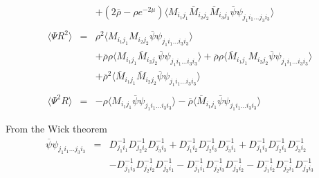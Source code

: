 \documentclass[a4paper,10pt]{report}
\newcommand{\ol}[1]{\overline{#1}}
\newcommand{\rrb}{\overline{\rho}}
\newcommand{\rr}{\rho}
\newcommand{\Mb}{\ol{M}}
\newcommand{\mv}[1]{\langle #1 \rangle}
\newcommand{\ppb}{\ol{\psi}\psi}
\newcommand{\D}{D^{-1}}
\begin{document}
\begin{eqnarray}
          && + (2\rrb-\rr e^{-2\mu}) \mv{M_{i_1j_1}\Mb_{i_2j_2}\Mb_{i_3j_3} \ppb_{j_1i_1...j_3i_3}}    \\
\nonumber\\
\mv{\Psi R^2} &=& \rr^2 \mv{M_{i_1j_1}M_{i_2j_2} \ppb_{j_1i_1...i_3i_3}} \nonumber\\
          && +  \rrb \rr \mv{M_{i_1j_1}\Mb_{i_2j_2} \ppb_{j_1i_1...i_3i_3}} 
          + \rrb \rr \mv{\Mb_{i_1j_1}M_{i_2j_2} \ppb_{j_1i_1...i_3i_3}} \nonumber\\
          && + \rrb^2 \mv{\Mb_{i_1j_1}\Mb_{i_2j_2}\ppb_{j_1i_1...i_3i_3}}    \\
\nonumber\\
\mv{\Psi^2 R} &=&  - \rr \mv{M_{i_1j_1}\ppb_{j_1i_1...i_3i_3}} - \rrb \mv{\Mb_{i_1j_1} \ppb_{j_1i_1...i_3i_3}}
\end{eqnarray}

\vspace*{3mm}
\noindent From the Wick theorem
\begin{eqnarray}
\ppb_{j_1i_1...j_3i_3} &=& \D_{j_1i_1}\D_{j_2i_2}\D_{j_3i_3} + \D_{j_1i_2}\D_{j_2i_3}\D_{j_3i_1} 
		   + \D_{j_1i_3}\D_{j_2i_1}\D_{j_3i_2} \nonumber\\&& - \D_{j_1i_3}\D_{j_2i_2}\D_{j_3i_1}
		   - \D_{j_1i_1}\D_{j_2i_3}\D_{j_3i_2}- \D_{j_1i_2}\D_{j_2i_1}\D_{j_3i_3} \nonumber
\end{eqnarray}
\end{document}
